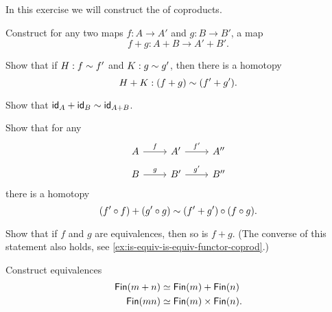 \begin{exercises}
\begin{subexenum}
  \end{subexenum}
\item \label{ex:coproduct_functor}In this exercise we will construct the  of coproducts.
  \begin{subexenum}
  \item Construct for any two maps $f:A \to A'$ and $g:B \to B'$, a map
    \begin{equation*}
      f+g:A+B \to A'+B'.
    \end{equation*}
  \item Show that if $H:f\htpy f'$ and $K:g\htpy g'$, then there is a homotopy
    \begin{equation*}
      H+K:(f+g)\htpy (f'+g').
    \end{equation*}
  \item Show that $\idfunc[A]+\idfunc[B]\htpy \idfunc[A+B]$.
  \item Show that for any
    \begin{equation*}
      \begin{tikzcd}[row sep=small]
        A \arrow[r,"f"] & {A'} \arrow[r,"{f'}"] & {A''} \\
        B \arrow[r,"g"] & {B'} \arrow[r,"{g'}"] & {B''}
      \end{tikzcd}
    \end{equation*}
    there is a homotopy
    \begin{equation*}
      (f'\circ f)+(g'\circ g) \htpy (f'+g')\circ (f\circ g).
    \end{equation*}
  \item \label{ex:coproduct_functor_equivalence}Show that if $f$ and $g$ are equivalences, then so is $f+g$. (The converse of this statement also holds, see \cref{ex:is-equiv-is-equiv-functor-coprod}.)
  \end{subexenum}
\item Construct equivalences
  \begin{align*}
    \Fin(m+n) & \simeq \Fin(m)+\Fin(n) \\
    \Fin(mn) & \simeq \Fin(m)\times\Fin(n).
  \end{align*}
\end{exercises}
